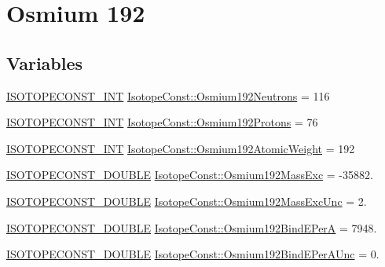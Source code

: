 \hypertarget{group___isotope_const-_osmium-_os192}{}\section{Osmium 192}
\label{group___isotope_const-_osmium-_os192}
\subsection*{Variables}
\begin{DoxyCompactItemize}
\item 
\mbox{\hyperlink{group___isotope_const-_macros_ga5f18360b3e99483a35c32d789e62621c}{I\+S\+O\+T\+O\+P\+E\+C\+O\+N\+S\+T\+\_\+\+I\+NT}} \mbox{\hyperlink{group___isotope_const-_osmium-_os192_gaeba9ebc6413583cfd1833acdf58f154e}{Isotope\+Const\+::\+Osmium192\+Neutrons}} = 116
\item 
\mbox{\hyperlink{group___isotope_const-_macros_ga5f18360b3e99483a35c32d789e62621c}{I\+S\+O\+T\+O\+P\+E\+C\+O\+N\+S\+T\+\_\+\+I\+NT}} \mbox{\hyperlink{group___isotope_const-_osmium-_os192_ga7fcbd219e6081bbc9d9fb4f604d7ba13}{Isotope\+Const\+::\+Osmium192\+Protons}} = 76
\item 
\mbox{\hyperlink{group___isotope_const-_macros_ga5f18360b3e99483a35c32d789e62621c}{I\+S\+O\+T\+O\+P\+E\+C\+O\+N\+S\+T\+\_\+\+I\+NT}} \mbox{\hyperlink{group___isotope_const-_osmium-_os192_ga9b475f7a7f7901f783140eced1f13b09}{Isotope\+Const\+::\+Osmium192\+Atomic\+Weight}} = 192
\item 
\mbox{\hyperlink{group___isotope_const-_macros_ga8f45a7272ce02c0b4c65c44636ed719a}{I\+S\+O\+T\+O\+P\+E\+C\+O\+N\+S\+T\+\_\+\+D\+O\+U\+B\+LE}} \mbox{\hyperlink{group___isotope_const-_osmium-_os192_gaadb90862f21baa8bf9cd648b337bcd30}{Isotope\+Const\+::\+Osmium192\+Mass\+Exc}} = -\/35882.
\item 
\mbox{\hyperlink{group___isotope_const-_macros_ga8f45a7272ce02c0b4c65c44636ed719a}{I\+S\+O\+T\+O\+P\+E\+C\+O\+N\+S\+T\+\_\+\+D\+O\+U\+B\+LE}} \mbox{\hyperlink{group___isotope_const-_osmium-_os192_ga98a5115d5b338d6de05a3fc2c02aba91}{Isotope\+Const\+::\+Osmium192\+Mass\+Exc\+Unc}} = 2.
\item 
\mbox{\hyperlink{group___isotope_const-_macros_ga8f45a7272ce02c0b4c65c44636ed719a}{I\+S\+O\+T\+O\+P\+E\+C\+O\+N\+S\+T\+\_\+\+D\+O\+U\+B\+LE}} \mbox{\hyperlink{group___isotope_const-_osmium-_os192_gabcf5b7b6ede108032eb4b23f882b486a}{Isotope\+Const\+::\+Osmium192\+Bind\+E\+PerA}} = 7948.
\item 
\mbox{\hyperlink{group___isotope_const-_macros_ga8f45a7272ce02c0b4c65c44636ed719a}{I\+S\+O\+T\+O\+P\+E\+C\+O\+N\+S\+T\+\_\+\+D\+O\+U\+B\+LE}} \mbox{\hyperlink{group___isotope_const-_osmium-_os192_gaf360d26f32cfa15b2df74c5d5f46a713}{Isotope\+Const\+::\+Osmium192\+Bind\+E\+Per\+A\+Unc}} = 0.

\end{DoxyCompactItemize}
